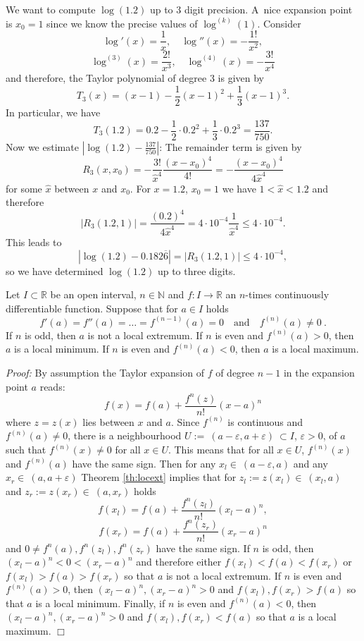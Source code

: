 \begin{example}
We want to compute $\log(1.2)$ up to 3 digit precision. A~nice expansion point is $x_0=1$ since we know the precise values of $\log^{(k)}(1)$. Consider
$$
\log'(x)=\frac1x,\quad \log''(x)=-\frac{1!}{x^2},
$$
$$
\log^{(3)}(x)=\frac{2!}{x^3},\quad\log^{(4)}(x)=-\frac{3!}{x^4}
$$
and therefore, the Taylor polynomial of degree 3 is given by
\[T_3(x)=(x-1)-\frac12(x-1)^2+\frac13(x-1)^3.\]
In particular, we have
\[T_3(1.2)=0.2-\frac12\cdot 0.2^2+\frac13 \cdot 0.2^3=\frac{137}{750}.\]
Now we estimate $|\log(1.2)-\frac{137}{750}|$: The remainder term is given by
\[R_3(x,x_0)=-\frac{3!}{\hat{x}^4}\frac{(x-x_0)^{4}}{4!}=-\frac{(x-x_0)^{4}}{4\hat{x}^4}\]
for some $\hat{x}$ between $x$ and $x_0$. For $x=1.2$, $x_0=1$ we have $1<\hat{x}<1.2$ and therefore
\[ | R_3(1.2,1) | =\frac{(0.2)^{4}}{4\hat{x}^4}=4\cdot10^{-4}\frac{1}{\hat{x}^4}\leq4\cdot10^{-4}.\]
This leads to
\[|\log(1.2)-0.182\overline{6}|=|R_3(1.2,1)|\leq4\cdot10^{-4},\]
so we have determined $\log(1.2)$ up to three digits.
\end{example}

\begin{Theorem}\label{th:locext}
    Let $I\subset \mathbb{R}$ be an open interval, $n\in\mathbb{N}$ and $f:I\rightarrow\mathbb{R}$ an $n$-times continuously differentiable function. 
  Suppose that for $a\in I$ holds 
	$$f'(a)=f''(a)=\dots=f^{(n-1)}(a)=0\quad \text{and}\quad f^{(n)}(a)\neq 0 \ .$$
	If $n$ is odd, then $a$ is not a local extremum.
  If $n$ is even and $f^{(n)}(a)> 0$, then $a$ is a local minimum.
  If $n$ is even and $f^{(n)}(a)< 0$, then $a$ is a local maximum.   
\end{Theorem}

{\em Proof:} By assumption the Taylor expansion of $f$ of degree $n-1$ in the expansion point $a$ reads:
	\begin{equation}\label{eq:locext1} f(x)=f(a)+\frac{f^{n}(z)}{n!}(x-a)^n  \end{equation}
  where $z=z(x)$ lies between $x$ and $a$. Since $f^{(n)}$ is continuous and $f^{(n)}(a)\neq 0$,
  there is a neighbourhood $U:=~(a-\varepsilon,a+\varepsilon)~\subset I$, $\varepsilon>0$, of $a$ such that $f^{(n)}(x)\neq 0$ for all $x\in U$. 
  This means that for all $x\in U$, $f^{(n)}(x)$ and $f^{(n)}(a)$ have the same sign.
  Then for any $x_l \in~(a-\varepsilon,a)$ and any $x_r \in~(a,a+\varepsilon)$ Theorem \ref{th:locext} implies that for $z_l:=z(x_l)\in~(x_l,a)$ and $z_r:=z(x_r)\in~(a,x_r)$ holds
  $$
	  f(x_l) = f(a)+\frac{f^{n}(z_l)}{n!}(x_l-a)^n ,
  $$
  $$
	  f(x_r) = f(a)+\frac{f^{n}(z_r)}{n!}(x_r-a)^n
  $$
  and $0\neq f^{n}(a), f^{n}(z_l),f^{n}(z_r)$ have the same sign.
  If $n$ is odd,  then $(x_l-a)^n < 0 < (x_r-a)^n$  and therefore  either $f(x_l)<f(a)<f(x_r)$ or $f(x_l)>f(a)>f(x_r)$
  so that $a$ is not a local extremum.
  If $n$ is even and $f^{(n)}(a)>0$, then $(x_l-a)^n,(x_r-a)^n >0$ and $f(x_l),f(x_r)>f(a)$ so that $a$ is a local minimum.
  Finally, if $n$ is even and $f^{(n)}(a)<0$, then $(x_l-a)^n,(x_r-a)^n >0$ and $f(x_l),f(x_r)<f(a)$ so that $a$ is a local maximum.
$\Box$

